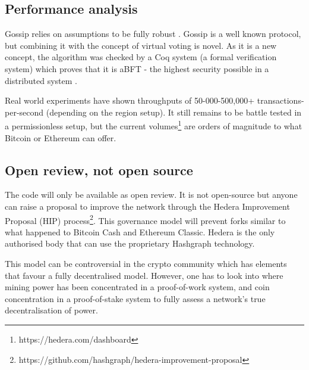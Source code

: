 \subsection{Performance analysis}
Gossip relies on assumptions to be fully robust \cite{alvisi}. Gossip is a well known protocol, but combining it with the concept of virtual voting is novel. As it is a new concept, the algorithm was checked by a Coq system (a formal verification system) which proves that it is aBFT - the highest security possible in a distributed system \cite{coq2018}.

Real world experiments have shown throughputs of 50-000-500,000+ transactions-per-second (depending on the region setup)\cite{baird2018hedera}. It still remains to be battle tested in a permissionless setup, but the current volumes\footnote{https://hedera.com/dashboard} are orders of magnitude to what Bitcoin or Ethereum can offer.




\subsection{Open review, not open source}
The code will only be available as open review. It is not open-source but anyone can raise a proposal to improve the network through the Hedera Improvement Proposal (HIP) process\footnote{https://github.com/hashgraph/hedera-improvement-proposal}. This governance model will prevent forks similar to what happened to Bitcoin Cash and Ethereum Classic. Hedera is the only authorised body that can use the proprietary Hashgraph technology.

This model can be controversial in the crypto community which has elements that favour a fully decentralised model. However, one has to look into where mining power has been concentrated in a proof-of-work system, and coin concentration in a proof-of-stake system to fully assess a network's true decentralisation of power.


